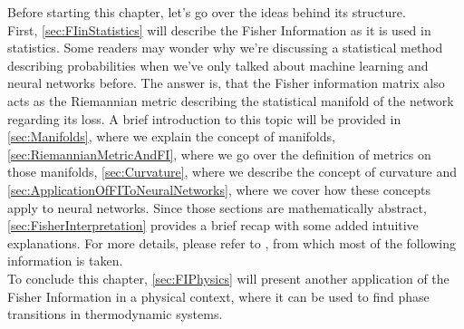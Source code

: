 Before starting this chapter, let's go over the ideas behind its structure.\\
First, \cref{sec:FIinStatistics} will describe the Fisher Information as it is used in statistics. Some readers may wonder why we're discussing a statistical method describing probabilities when we've only talked about machine learning and neural networks before. The answer is, that the Fisher information matrix also
acts as the Riemannian metric describing the statistical manifold of the network regarding its loss. A brief introduction to this topic will be provided in \cref{sec:Manifolds}, where we explain the concept of manifolds, \cref{sec:RiemannianMetricAndFI}, where we go over the definition of metrics on those manifolds, \cref{sec:Curvature}, where we describe the concept of curvature and \cref{sec:ApplicationOfFIToNeuralNetworks}, where we cover how these concepts apply to neural networks. Since those sections are mathematically abstract, \cref{sec:FisherInterpretation} provides a brief recap with some added intuitive explanations. For more details, please refer to \cite{AmarisLectureNotes}, from which most of the following information is taken.\\
To conclude this chapter, \cref{sec:FIPhysics} will present another application of the Fisher Information in a physical context, where it can be used to find phase transitions in thermodynamic systems.